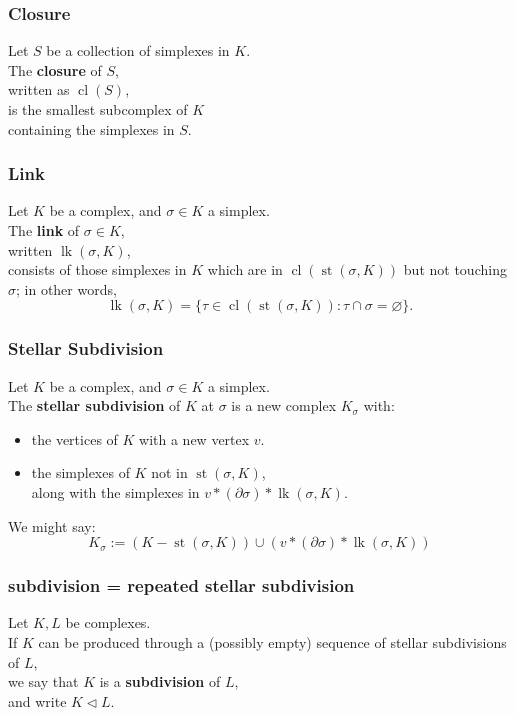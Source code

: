\documentclass[14pt]{beamer}
\newcommand{\boundary}{\partial}
\newcommand{\join}{\ast}
\newcommand{\subdivided}{\triangleleft}
\DeclareMathOperator{\st}{st}
\DeclareMathOperator{\lk}{lk}
\DeclareMathOperator{\cl}{cl}
\newcommand{\setbackgroundpicture}[1]{%
\usebackgroundtemplate{
\begin{pgfpicture}{0in}{0in}{\paperwidth}{\paperheight}
\pgfputat{\pgfxy(0,0)}{\texttt{[image: \#1]}}
\color{white}
\pgfsetfillopacity{0.8}
\pgfrect[fill]{\pgfxy(0,0)}{\pgfpoint{\paperwidth}{\paperheight}}
\end{pgfpicture}
}
}
\newcommand{\clearbackgroundpicture}{\usebackgroundtemplate{}}
\begin{document}
\setbackgroundpicture{closed-star.pdf}
\begin{frame}
\frametitle{Closure}
\begin{definition}
Let $S$ be a collection of simplexes in $K$.  \\
The \textbf{closure} of $S$, \\
\quad written as $\cl(S)$, \\
is the smallest subcomplex of $K$ \\
containing the simplexes in $S$.
\end{definition}
\end{frame}
\clearbackgroundpicture

\setbackgroundpicture{link.pdf}
\begin{frame}
\frametitle{Link}

\begin{definition}
Let $K$ be a complex, and $\sigma \in K$ a simplex.  \\
The \textbf{link} of $\sigma \in K$, \\
\quad written $\lk(\sigma,K)$, \\
consists of those simplexes in $K$ which are in $\cl(\st(\sigma,K))$
but not touching $\sigma$; in other words,
$$
\lk(\sigma,K) = \{ \tau \in \cl(\st(\sigma,K)) : \tau \cap \sigma =
\varnothing \}.
$$
\end{definition}
\end{frame}
\clearbackgroundpicture

\begin{frame}
\frametitle{Stellar Subdivision} 

\begin{definition}
  Let $K$ be a complex, and $\sigma \in K$ a simplex.  \\
  The \textbf{stellar subdivision} of $K$ at $\sigma$ is a new complex
  $K_\sigma$ with:
\begin{itemize}
\item the vertices of $K$ with a new vertex $v$.
\item the simplexes of $K$ not in $\st(\sigma,K)$,\\
  along with the simplexes in $v \join (\boundary \sigma) \join \lk(\sigma,K)$.
\end{itemize}
We might say:
$$
K_\sigma := (K - \st(\sigma,K)) \cup (v \join (\boundary \sigma) \join
\lk(\sigma,K))
$$
\end{definition}
\end{frame}

\begin{frame}
\frametitle{subdivision = repeated stellar subdivision}

\begin{definition}
  Let $K, L$ be complexes.  \\
  If $K$ can be produced through a (possibly
  empty) sequence of stellar subdivisions of $L$, \\
  we say that $K$ is a   \textbf{subdivision} of $L$, \\
  and write $K \subdivided L$.
\end{definition}
\end{frame}
\end{document}

